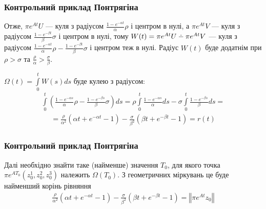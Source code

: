 \documentclass[10pt,pdf]{beamer}
\renewcommand{\l}{\left}
\renewcommand{\r}{\right}
\newcommand{\norm}[1]{\left\Vert #1 \right\Vert}
\newcommand{\intl}{\int\limits}
\def\setdif{\mathbin{\ooalign{\hss\raise1ex\hbox{.}\hss\cr
  \mathsurround=0pt$-$}}}
\begin{document}
    \begin{frame}
        \frametitle{Контрольний приклад Понтрягіна}
    
        Отже, $\pi e^{At} U$ --- куля з радіусом $\frac{1 - e^{-\alpha t}}{\alpha}\rho$ і центром в нулі,
        а $\pi e^{At} V$ --- куля з радіусом $\frac{1 - e^{-\beta t}}{\beta}\sigma$ і центром в нулі, тому
        $W(t) = \pi e^{At}U \setdif \pi e^{At}V$ --- куля з радіусом 
        $\frac{1 - e^{-\alpha t}}{\alpha}\rho - \frac{1 - e^{-\beta t}}{\beta}\sigma$ і центром теж в нулі.
        Радіус $W(t)$ буде додатнім при $\rho > \sigma$ та $\frac{\rho}{\alpha} > \frac{\sigma}{\beta}$.
        
        $\Omega(t) = \intl_0^t W(s) ds$ буде кулею
        з радіусом:
        \begin{gather*}
            \intl_0^t \left(\frac{1 - e^{-\alpha s}}{\alpha}\rho - \frac{1 - e^{-\beta s}}{\beta} \sigma\right) ds = 
            \rho \intl_0^t \frac{1 - e^{-\alpha s}}{\alpha} ds - \sigma \intl_0^t \frac{1 - e^{-\beta s}}{\beta} ds =
        \end{gather*}
        \begin{gather*}
            = \frac{\rho}{\alpha^2}\l(\alpha t + e^{-\alpha t} - 1\r) - 
            \frac{\sigma}{\beta^2}\l(\beta t + e^{-\beta t} - 1\r) = r(t)
        \end{gather*}
    
    \end{frame}
    \begin{frame}
        \frametitle{Контрольний приклад Понтрягіна}
    
        Далі необхідно знайти таке (найменше) значення $T_0$, для якого точка $\pi e^{A T_0}(z^1_0, z^2_0, z^3_0)$ належить
        $\Omega(T_0)$. З геометричних міркувань це буде найменший корінь рівняння
        \begin{gather*}
            \frac{\rho}{\alpha^2}\l(\alpha t + e^{-\alpha t} - 1\r) - 
            \frac{\sigma}{\beta^2}\l(\beta t + e^{-\beta t} - 1\r) = \norm{\pi e^{A t} z_0}
        \end{gather*}

    \end{frame}
\end{document}
